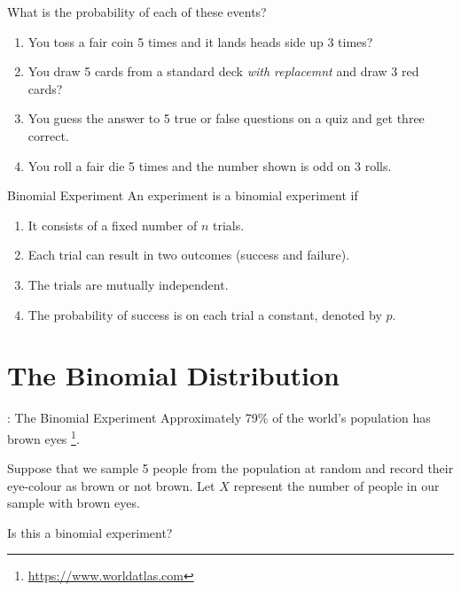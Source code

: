 \begin{frame}

\begin{block}{\example}
What is the probability of each of these events?

\medskip

\begin{enumerate}[label=\alph*),start=1]
\item You toss a fair coin 5 times and it lands heads side up 3 times?
\item You draw 5 cards from a standard deck \textit{with replacemnt} and draw 3 red cards?
\item You guess the answer to 5 true or false questions on a quiz and get three correct.
\item You roll a fair die 5 times and the number shown is odd on 3 rolls. 
\end{enumerate}

\end{block}
\end{frame}

\begin{frame}
  
  \begin{block}{Binomial Experiment}
    An experiment is a binomial experiment if
    \begin{enumerate}[label=\alph*),start=1]
    \item It consists of a fixed number of $n$ trials.
    \item Each trial can result in two outcomes (success and failure).
    \item The trials are mutually independent.
    \item The probability of success is on each trial a constant, denoted by $p$.
    \end{enumerate}
  \end{block}
  
\end{frame}

\section{The Binomial Distribution}

\begin{frame}

  \begin{block}{\example: The Binomial Experiment}
    Approximately 79\% of the world's population has brown eyes \footnote{\url{https://www.worldatlas.com}}.
    
    Suppose that we sample 5 people from the population at random and record their eye-colour as brown or not brown. Let $X$ represent the number of people in our sample with brown eyes.
    
    \bigskip

    \begin{center}
      Is this a binomial experiment?
    \end{center}
  \end{block}
  
\end{frame}


